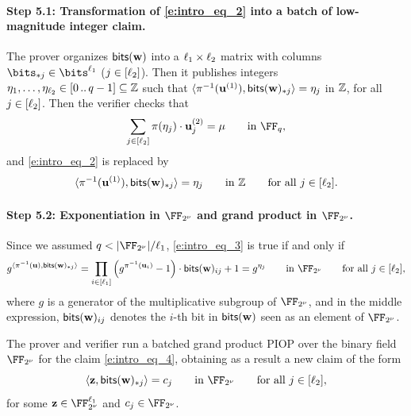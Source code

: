 \documentclass[11pt,letterpaper,usenames,dvipsnames]{article}
\begin{document}
     \paragraph{Step 5.1: Transformation of \eqref{e:intro_eq_2} into a batch of low-magnitude integer claim.} The prover organizes $\mathsf{bits}(\mathbf{w})$ into a $\ell_1\times \ell_2$ matrix with columns $\bits_{*j}\in \bits^{\codedim_1}$ ($j\in [\ell_2]$). Then it publishes  integers $\eta_1,\ldots, \eta_{\ell_2}\in [0 \, .. \, q-1] \subseteq \mathbb{Z}$ such that 
         $\langle \pi^{-1}(\mathbf{u}^{(1)}), \mathsf{bits}(\mathbf{w})_{*j}\rangle = \eta_j$  in $\mathbb{Z}$, for all $j\in [\ell_2]$.  
         Then the verifier checks that
         $$
        \sum_{j\in [\codedim_2]} \pi(\eta_j) \cdot \uu_j^{(2)} = \mu \qquad \text{in  } \FF_q,
         $$
         and \eqref{e:intro_eq_2} is replaced by \begin{equation}\label{e:intro_eq_3}\langle \pi^{-1}(\mathbf{u}^{(1)}), \mathsf{bits}(\mathbf{w})_{*j}\rangle =\eta_j \qquad \text{in  } \mathbb{Z} \qquad \text{for all } j\in [\ell_2].
        \end{equation} 
        \paragraph{Step 5.2: Exponentiation in $\comfield$ and grand product in $\comfield$.}  Since we assumed $q< |\comfield|/\codedim_1$, \eqref{e:intro_eq_3} is true if and only if
          \begin{equation}\label{e:intro_eq_4}g^{\langle \pi^{-1}(\uu), \mathsf{bits}(\ww)_{*j}\rangle} = \prod_{i\in [\codedim_1]} \left(g^{\pi^{-1}(\uu_i)} -1\right)\cdot \mathsf{bits}(\ww)_{ij}  +1 =g^{\eta_j} \qquad \text{in  } \comfield \qquad \text{for all } j\in [\codedim_2],
        \end{equation} 
        where $g$ is a generator of the multiplicative subgroup of $\comfield$, and in the middle expression, $\mathsf{bits}(\mathbf{w})_{ij}$ denotes the $i$-th bit in $\mathsf{bits}(\mathbf{w})$ seen as an element of $\comfield$.

        The prover and verifier run  a batched grand product PIOP over the binary field $\comfield$ for the claim  \eqref{e:intro_eq_4}, obtaining as a result a new claim of the form
        \begin{equation}\label{e:intro_eq_5} \langle \zz, \mathsf{bits}(\ww)_{*j} \rangle = c_j \qquad \text{in  } \comfield \qquad \text{for all } j\in [\codedim_2],
        \end{equation} 
        for some $\zz\in \comfield^{\codedim_1}$ and $c_j\in \comfield$.
\end{document}
